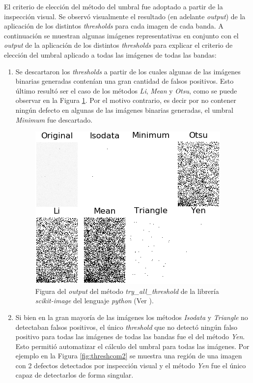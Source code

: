 El criterio de elección del método del umbral fue adoptado a partir de la inspección visual. Se observó visualmente el resultado (en adelante \textit{output}) de la aplicación de los distintos \textit{thresholds} para cada imagen de cada banda. A continuación se muestran algunas imágenes representativas en conjunto con el \textit{output} de la aplicación de los distintos \textit{thresholds} para explicar el criterio de elección del umbral aplicado a todas las imágenes de todas las bandas:
\begin{enumerate}
\justifying
\item Se descartaron los \textit{thresholds} a partir de los cuales algunas de las imágenes binarias generadas contenían una gran cantidad de falsos positivos. Esto último resultó ser el caso de los métodos \textit{Li}\cite{Lie}, \textit{Mean}\cite{Glasmean} y \textit{Otsu}\cite{otsuu}, como se puede observar en la Figura \ref{fig:threshcom}. Por el motivo contrario, es decir por no contener ningún defecto en algunas de las imágenes binarias generadas, el umbral \textit{Minimum}\cite{pericles} fue descartado.
\begin{figure}[H]
	\centering
	\includegraphics[scale=1.5]{Figs/defectosZEISS/thresh_comparison.png}
	\caption{Figura del \textit{output} del método \textit{try\_all\_threshold} de la librería \textit{scikit-image} del lenguaje \textit{python} (Ver \href{https://github.com/jrr1984/defects_analysis/blob/master/MAIN/try_all_thresholds.py}{\faGithub}).} 
	\label{fig:threshcom}
\end{figure}

\item Si bien en la gran mayoría de las imágenes los métodos \textit{Isodata}\cite{ridler} y \textit{Triangle}\cite{triang} no detectaban falsos positivos, el único \textit{threshold} que no detectó ningún falso positivo para todas las imágenes de todas las bandas fue el del método \textit{Yen}. Esto permitió automatizar el cálculo del umbral para todas las imágenes. Por ejemplo en la Figura \ref{fig:threshcom2} se muestra una región de una imagen con 2 defectos detectados por inspección visual y el método \textit{Yen} fue el único capaz de detectarlos de forma singular.


\end{enumerate}
